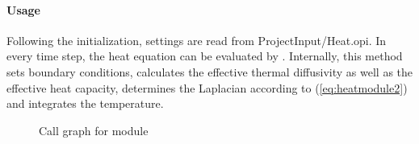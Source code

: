\paragraph{Usage} Following the initialization, settings are read from ProjectInput/Heat.opi. In every time step, the heat equation can be evaluated by . Internally, this method sets boundary conditions, calculates the effective thermal diffusivity as well as the effective heat capacity, determines the Laplacian according to (\ref{eq:heatmodule2}) and integrates the temperature.  

\CallGraphSettings

\begin{figure}
\centering
{}
\caption{Call graph for module }
\end{figure}
